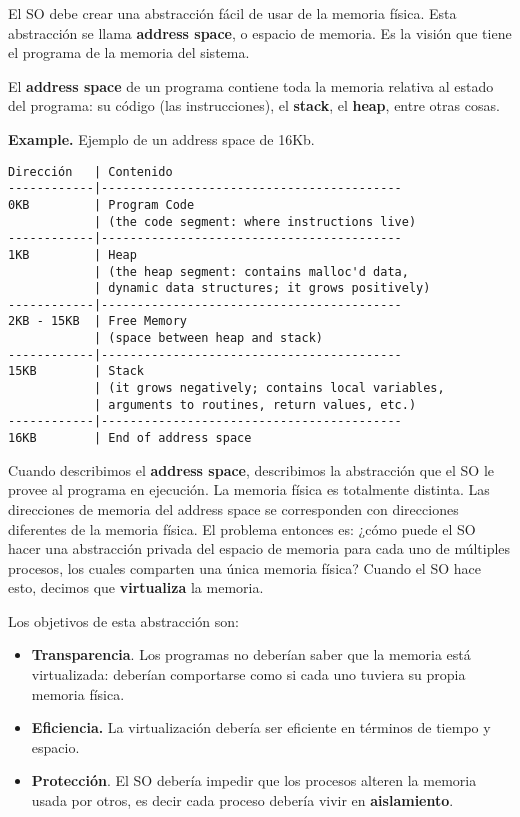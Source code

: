 \documentclass[12pt]{article}
\theoremstyle{definition}
\begin{document}
\normalsize

El SO debe crear una abstracción fácil de usar de la memoria física. Esta
abstracción se llama \textbf{address space}, o espacio de memoria. Es la visión
que tiene el programa de la memoria del sistema.

El \textbf{address space} de un programa contiene toda la memoria relativa al
estado del programa: su código (las instrucciones), el \textbf{stack}, el 
\textbf{heap}, entre otras cosas.

\begin{shaded}
    
\textbf{Example.} Ejemplo de un address space de 16Kb.

\footnotesize
\begin{verbatim}
Dirección   | Contenido
------------|------------------------------------------
0KB         | Program Code
            | (the code segment: where instructions live)
------------|------------------------------------------
1KB         | Heap
            | (the heap segment: contains malloc'd data,
            | dynamic data structures; it grows positively)
------------|------------------------------------------
2KB - 15KB  | Free Memory
            | (space between heap and stack)
------------|------------------------------------------
15KB        | Stack
            | (it grows negatively; contains local variables,
            | arguments to routines, return values, etc.)
------------|------------------------------------------
16KB        | End of address space
\end{verbatim}
\end{shaded}

Cuando describimos el \textbf{address space}, describimos la abstracción que el
SO le provee al programa en ejecución. La memoria física es totalmente distinta.
Las direcciones de memoria del address space se corresponden con direcciones
diferentes de la memoria física. El problema entonces es: ¿cómo puede el SO
hacer una abstracción privada del espacio de memoria para cada uno de múltiples
procesos, los cuales comparten una única memoria física? Cuando el SO hace esto, decimos que \textbf{virtualiza} la memoria.

Los objetivos de esta abstracción son: 

\begin{itemize}
    \item \textbf{Transparencia}. Los programas no deberían saber que la memoria
        está virtualizada: deberían comportarse como si cada uno tuviera su
        propia memoria física. 
    \item \textbf{Eficiencia.} La virtualización debería ser eficiente en
        términos de tiempo y espacio. 
    \item \textbf{Protección}. El SO debería impedir que los procesos alteren la
        memoria usada por otros, es decir cada proceso debería vivir en
        \textbf{aislamiento}.
\end{itemize}
\end{document}
